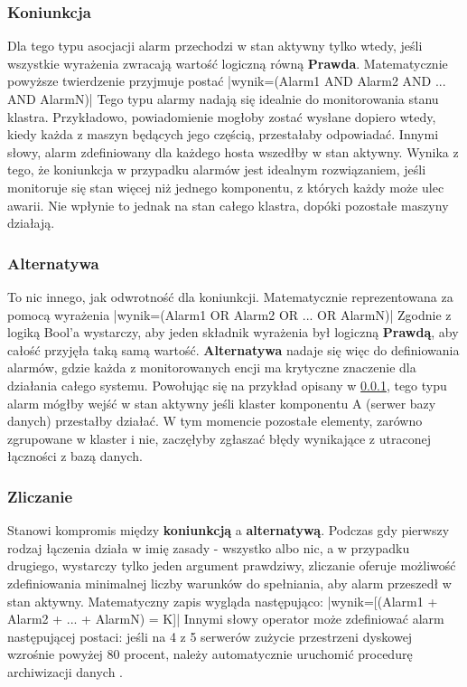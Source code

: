         \subsubsection{Koniunkcja}
        \label{chapter:monitoring:anatomy_of_alarm:assocation:and}
        Dla tego typu asocjacji alarm przechodzi w stan aktywny tylko wtedy, jeśli wszystkie wyrażenia
        zwracają wartość logiczną równą \textbf{Prawda}. Matematycznie powyższe twierdzenie przyjmuje postać
        |wynik=(Alarm1 AND Alarm2 AND ... AND AlarmN)|
        Tego typu alarmy nadają się idealnie
        do monitorowania stanu klastra. Przykładowo, powiadomienie mogłoby zostać wysłane dopiero 
        wtedy, kiedy każda z maszyn będących jego częścią, przestałaby odpowiadać. Innymi słowy,
        alarm zdefiniowany dla każdego hosta wszedłby w stan aktywny. Wynika z tego, że koniunkcja
        w przypadku alarmów jest idealnym rozwiązaniem, jeśli monitoruje się stan więcej niż jednego
        komponentu, z których każdy może ulec awarii. Nie wpłynie to jednak na stan całego klastra, dopóki
        pozostałe maszyny działają.
        
        \subsubsection{Alternatywa}
        To nic innego, jak odwrotność dla koniunkcji. Matematycznie reprezentowana za pomocą wyrażenia
        |wynik=(Alarm1 OR Alarm2 OR ... OR AlarmN)|
        Zgodnie z logiką Bool'a wystarczy, aby jeden
        składnik wyrażenia był logiczną \textbf{Prawdą}, aby całość przyjęła taką samą wartość. \textbf{Alternatywa}
        nadaje się więc do definiowania alarmów, gdzie każda z monitorowanych encji ma krytyczne znaczenie dla działania całego systemu.
        Powołując się na przykład opisany w \ref{chapter:monitoring:anatomy_of_alarm:assocation:and}, tego typu
        alarm mógłby wejść w stan aktywny jeśli klaster komponentu A (serwer bazy danych) przestałby działać. W tym momencie pozostałe
        elementy, zarówno zgrupowane w klaster i nie, zaczęłyby zgłaszać błędy wynikające z utraconej łączności
        z bazą danych.
        
        \subsubsection{Zliczanie}
        Stanowi kompromis między \textbf{koniunkcją} a \textbf{alternatywą}. Podczas gdy pierwszy rodzaj łączenia działa
        w imię zasady - wszystko albo nic, a w przypadku drugiego, wystarczy tylko jeden argument prawdziwy, zliczanie oferuje możliwość
        zdefiniowania minimalnej liczby warunków do spełniania, aby alarm przeszedł w stan aktywny.
        Matematyczny zapis wygląda następująco:
        |wynik=[(Alarm1 + Alarm2 + ... + AlarmN) = K]|
        Innymi słowy operator może zdefiniować alarm następującej postaci: jeśli na 4 z 5 serwerów zużycie przestrzeni dyskowej
        wzrośnie powyżej 80 procent, należy automatycznie uruchomić procedurę archiwizacji danych \cite{monitoring_and_alerting}. 